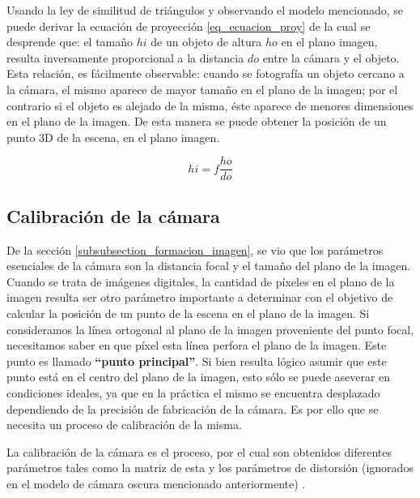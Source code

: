 \documentclass[a4paper,11pt,spanish]{article}
\begin{document}
Usando la ley de similitud de triángulos y observando el modelo mencionado, se puede derivar la ecuación de proyección \eqref{eq_ecuacion_proy} de la cual se desprende que: el tamaño $hi$ de un objeto de altura $ho$ en el plano imagen, resulta inversamente proporcional a la distancia $do$ entre la cámara y el objeto. Esta relación, es fácilmente observable: cuando se fotografía un objeto cercano a la cámara, el mismo  aparece de mayor tamaño en el plano de la imagen; por el contrario si el objeto es alejado de la misma, éste aparece de menores dimensiones en el plano de la imagen. De esta manera se puede obtener la posición de un punto 3D de la escena, en el plano imagen.

\begin{equation}
 hi=f\frac{ho}{do}
\label{eq_ecuacion_proy}
\end{equation}

\subsection{Calibración de la cámara}
De la sección \ref{subsubsection_formacion_imagen}, se vio que los parámetros esenciales de la cámara son la distancia focal y el tamaño del plano de la imagen.
Cuando se trata de imágenes digitales, la cantidad de píxeles en el plano de la imagen resulta ser otro parámetro importante a determinar con el objetivo de calcular la posición %
de un punto de la escena en el plano de la imagen. Si consideramos la línea ortogonal al plano de la imagen proveniente del punto focal, necesitamos saber en que píxel esta línea perfora el plano de la imagen. Este punto es llamado \textbf{``punto principal''}. Si bien resulta lógico asumir que este punto está en el centro del plano de la imagen, esto sólo se puede aseverar en condiciones ideales, ya que en la práctica el mismo se encuentra desplazado dependiendo de la precisión de fabricación de la cámara. Es por ello que se necesita un proceso de calibración de la misma.

La calibración de la cámara es el proceso, por el cual son obtenidos diferentes parámetros tales como la matriz de esta y los parámetros de distorsión (ignorados en el modelo de cámara oscura mencionado anteriormente) \cite{citeulike:3484001, citeulike:9456628}. %
\end{document}
